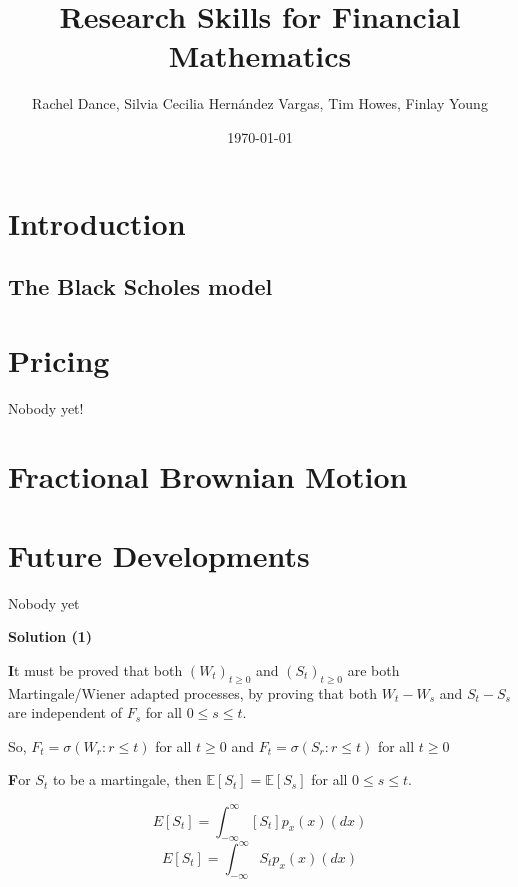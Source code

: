 \documentclass[12pt]{article}
\title{Research Skills for Financial Mathematics\\
\large{}}
\author{Rachel Dance, Silvia Cecilia Hernández Vargas, Tim Howes, Finlay Young}
\date{\today}
\newcommand{\E}{\mathbb{E}}
\begin{document}
\maketitle

\section{Introduction}


\subsection{The Black Scholes model}


\section{Pricing}
Nobody yet!

\section{Fractional Brownian Motion}



\section{Future Developments}
Nobody yet

\noindent\textbf{Solution (1)}

\textbf
It must be proved that both $(W_t)_{t\geq0}$ and $(S_t)_{t\geq0}$ are both Martingale/Wiener adapted processes,  by proving that both $W_t - W_s$ and $S_t - S_s$ are independent of $F_s$ for all $0\leq s \leq t$.

 So, $F_t = \sigma (W_r: r\leq t)$ for all $t\geq 0$ and $F_t = \sigma (S_r: r\leq t)$ for all $t\geq 0$

\noindent\textbf For $S_t$ to be a martingale, then $\E [S_t] = \E [S_s]$ for all $0\leq s \leq t$.

\[
    E[S_t] =  \int_{-\infty}^{\infty} [S_t] p_x(x) (dx) 
\]
\[
    E[S_t] =  \int_{-\infty}^{\infty} S_t p_x(x) (dx) 
\]
\end{document}

